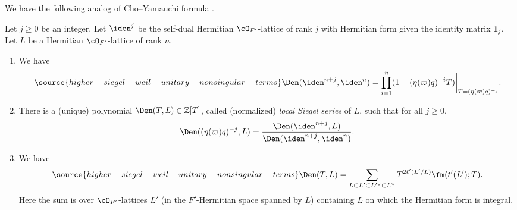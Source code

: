 We have the following analog of Cho--Yamauchi formula \cite{CY}.
\begin{thm}
\notready\label{th:CY}
Let $j\ge0$ be an integer. Let $\iden^j$ be the self-dual Hermitian $\cO_{F'}$-lattice of rank $j$ with Hermitian form given the identity matrix $\mathbf{1}_j$. Let $L$ be a Hermitian $\cO_{F'}$-lattice of rank $n$.
  \begin{enumerate}
  \item We have
\begin{equation}
  \label{eq: iden}
\source{higher-siegel-weil-unitary-nonsingular-terms}
\Den(\iden^{n+j}, \iden^n)=\prod_{i=1}^n(1-(\eta(\varpi)q)^{-i}T)\bigg|_{T= (\eta(\varpi)q)^{-j}}.
\end{equation}
\item
There is  a (unique) polynomial $\Den(T,L)\in \mathbb{Z}[T]$, called  (normalized) \emph{local Siegel series} of $L$,  such that for all $j\geq 0$,
$$\Den((\eta(\varpi) q)^{-j},L)=\frac{\Den(\iden^{n+j}, L)}{\Den(\iden^{n+j}, \iden^n)}.$$
  \item We have
\begin{equation}\label{eq:CY}
\source{higher-siegel-weil-unitary-nonsingular-terms}
\Den(T,L) = \sum_{L \subset L '\subset L'^{\vee} \subset L^{\vee}} T^{2\ell'(L'/L)}\fm(  t'(L');T).
\end{equation}
Here the sum is over $\cO_{F'}$-lattices $L'$ (in the $F'$-Hermitian space spanned by $L$) containing $L$ on which the Hermitian form is integral.
\end{enumerate}
\end{thm}


